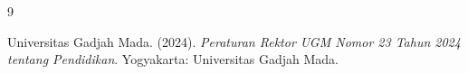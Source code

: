 \begin{thebibliography}{9}

\bibitem{}
Universitas Gadjah Mada. (2024). \textit{Peraturan Rektor UGM Nomor 23 Tahun 2024 tentang Pendidikan}. Yogyakarta: Universitas Gadjah Mada.

\end{thebibliography}
